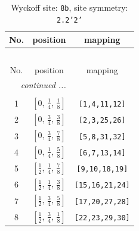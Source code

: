 \documentclass[fleqn,8pt]{jsarticle}
\begin{document}
\begin{longtable}{ccc}
\caption{Wyckoff site: {\tt 8b}, site symmetry: {\tt 2.2'2'}}
 \\
 \hline \hline
No. & position & mapping \\ \hline \endfirsthead

\multicolumn{2}{l}{\tablename\ \thetable{}} \\
 \hline \hline
No. & position & mapping \\ \hline \endhead

 \hline \hline
\multicolumn{2}{r}{\footnotesize\it continued ...} \\ \endfoot

 \hline \hline
\multicolumn{2}{r}{} \\ \endlastfoot

1 & $\left[ 0,\, \frac{1}{4},\, \frac{1}{8} \right]$ & {\tt [1,4,11,12]} \\ \hline
2 & $\left[ 0,\, \frac{3}{4},\, \frac{3}{8} \right]$ & {\tt [2,3,25,26]} \\ \hline
3 & $\left[ 0,\, \frac{3}{4},\, \frac{7}{8} \right]$ & {\tt [5,8,31,32]} \\ \hline
4 & $\left[ 0,\, \frac{1}{4},\, \frac{5}{8} \right]$ & {\tt [6,7,13,14]} \\ \hline
5 & $\left[ \frac{1}{2},\, \frac{1}{4},\, \frac{7}{8} \right]$ & {\tt [9,10,18,19]} \\ \hline
6 & $\left[ \frac{1}{2},\, \frac{1}{4},\, \frac{3}{8} \right]$ & {\tt [15,16,21,24]} \\ \hline
7 & $\left[ \frac{1}{2},\, \frac{3}{4},\, \frac{5}{8} \right]$ & {\tt [17,20,27,28]} \\ \hline
8 & $\left[ \frac{1}{2},\, \frac{3}{4},\, \frac{1}{8} \right]$ & {\tt [22,23,29,30]} \\
\end{longtable}
\renewcommand{\arraystretch}{1.2}
\end{document}
